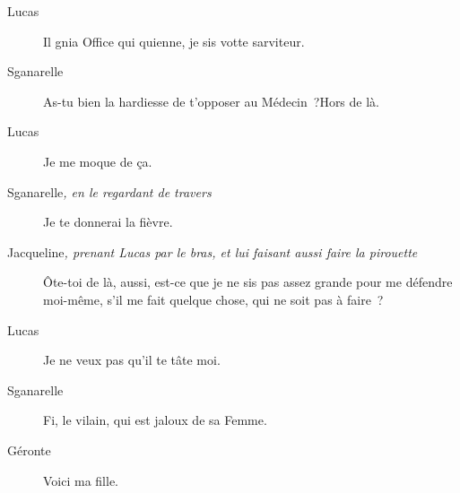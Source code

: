 \documentclass[french,twoside]{book} %
\begin{document}
 \begin{description} \item[Lucas] 

Il gnia Office qui quienne, je sis votte sarviteur.\end{description}
 \begin{description} \item[Sganarelle] 

As-tu bien la hardiesse de t’opposer au Médecin ?Hors de là.\end{description}
 \begin{description} \item[Lucas] 

Je me moque de ça.\end{description}
 \begin{description} \item[Sganarelle\textit{, en le regardant de travers}\par
] 

Je te donnerai la fièvre.\end{description}
 \begin{description} \item[Jacqueline\textit{, prenant Lucas par le bras, et lui faisant aussi faire la pirouette}\par
] 

Ôte-toi de là, aussi, est-ce que je ne sis pas assez grande pour me défendre moi-même, s’il me fait quelque chose, qui ne soit pas à faire ?\end{description}
 \begin{description} \item[Lucas] 

Je ne veux pas qu’il te tâte moi.\end{description}
 \begin{description} \item[Sganarelle] 

Fi, le vilain, qui est jaloux de sa Femme.\end{description}
 \begin{description} \item[Géronte] 

Voici ma fille.\end{description}
\end{document}
